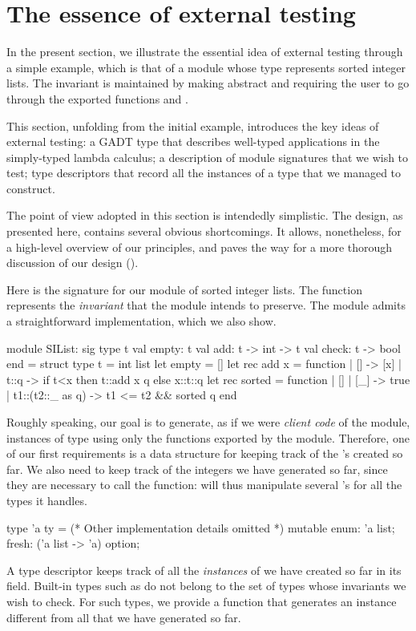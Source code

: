 \section{The essence of external testing}
\label{sec:essence}

In the present section, we illustrate the essential idea of external testing
through a simple example, which is that of a module  whose type
 represents sorted integer lists. The invariant is maintained by making
 abstract and requiring the user to go through the exported functions
 and .

This section, unfolding from the initial example, introduces the key ideas of
external testing: a GADT type that describes well-typed applications in the
simply-typed lambda calculus; a description of module signatures that we wish to
test; type descriptors that record all the instances of a type that we managed
to construct.

The point of view adopted in this section is intendedly simplistic. The design,
as presented here, contains several obvious shortcomings. It allows,
nonetheless, for a high-level overview of our principles, and paves the way for
a more thorough discussion of our design ().

Here is the signature for our module of sorted integer lists.
The  function represents the \emph{invariant} that the module
intends to preserve. The module admits a straightforward implementation, which
we also show.
%
\begin{ocamlcode}
module SIList: sig
  type t
  val empty: t
  val add: t -> int -> t
  val check: t -> bool
end = struct
  type t = int list
  let empty = []
  let rec add x = function
    | [] -> [x]
    | t::q -> if t<x then t::add x q else x::t::q
  let rec sorted = function
    | [] | [_] -> true
    | t1::(t2::_ as q) -> t1 <= t2 && sorted q
end
\end{ocamlcode}
%
Roughly speaking, our goal is to generate, as if we were \emph{client code} of
the module, instances of type  using only the functions exported by the
module. Therefore, one of our first requirements is a data structure for keeping
track of the 's created so far. We also need to keep track of the
integers we have generated so far, since they are necessary to call the
 function: \arti will thus manipulate several 's for all the
types it handles.
%
\begin{ocamlcode}
type 'a ty = { (* Other implementation details omitted *)
  mutable enum: 'a list;
  fresh: ('a list -> 'a) option; }
\end{ocamlcode}
%
A type descriptor  keeps track of all the \emph{instances} of
 we have created so far in its  field. Built-in types such
as  do not belong to the set of types whose invariants we wish to
check. For such types, we provide a  function that generates an
instance different from all that we have generated so far.

